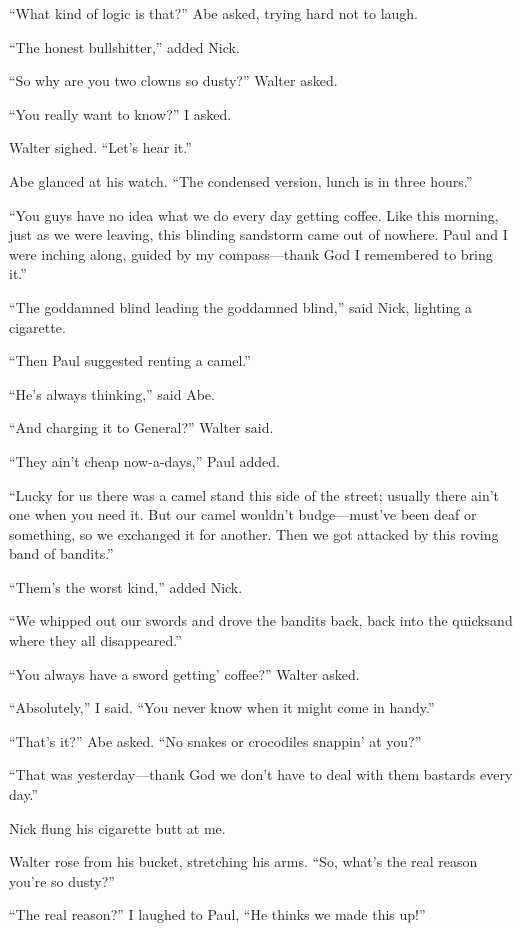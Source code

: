 ``What kind of logic is that?'' Abe asked, trying hard not to laugh.

``The honest bullshitter,'' added Nick.

``So why are you two clowns so dusty?'' Walter asked.

``You really want to know?'' I asked.

Walter sighed. ``Let's hear it.''

Abe glanced at his watch. ``The condensed version, lunch is in three
hours.''

``You guys have no idea what we do every day getting coffee. Like this
morning, just as we were leaving, this blinding sandstorm came out of
nowhere. Paul and I were inching along, guided by my com\-pass---thank God
I remembered to bring it.''

``The goddamned blind leading the goddamned blind,'' said Nick, lighting
a cigarette.

``Then Paul suggested renting a camel.''

``He's always thinking,'' said Abe.

``And charging it to General?'' Walter said.

``They ain't cheap now-a-days,'' Paul added.

``Lucky for us there was a camel stand this side of the street; usually
there ain't one when you need it. But our camel wouldn't budge---must've
been deaf or something, so we exchanged it for another. Then we got
attacked by this roving band of bandits.''

``Them's the worst kind,'' added Nick.

``We whipped out our swords and drove the bandits back, back into the
quicksand where they all disappeared.''

``You always have a sword getting' coffee?'' Walter asked.

``Absolutely,'' I said. ``You never know when it might come in handy.''

``That's it?'' Abe asked. ``No snakes or crocodiles snappin' at you?''

``That was yesterday---thank God we don't have to deal with them
bastards every day.''

Nick flung his cigarette butt at me.

Walter rose from his bucket, stretching his arms. ``So, what's the real
reason you're so dusty?''

``The real reason?'' I laughed to Paul, ``He thinks we made this up!''


